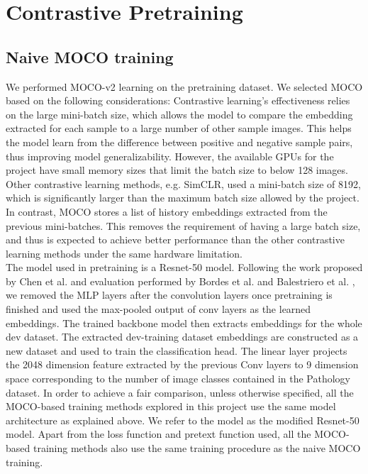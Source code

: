 \documentclass[12pt,twoside]{report}
\begin{document}
\section{Contrastive Pretraining}
\subsection{Naive MOCO training} \label{sec:naiveMOCO}
We performed MOCO-v2 \cite{mocov2} learning on the pretraining dataset. We selected MOCO based on the following considerations: Contrastive learning's effectiveness relies on the large mini-batch size, which allows the model to compare the embedding extracted for each sample to a large number of other sample images. This helps the model learn from the difference between positive and negative sample pairs, thus improving model generalizability. However, the available GPUs for the project have small memory sizes that limit the batch size to below 128 images. Other contrastive learning methods, e.g. SimCLR, used a mini-batch size of 8192, which is significantly larger than the maximum batch size allowed by the project. In contrast, MOCO stores a list of history embeddings extracted from the previous mini-batches. This removes the requirement of having a large batch size, and thus is expected to achieve better performance than the other contrastive learning methods under the same hardware limitation.\\

The model used in pretraining is a Resnet-50 model. Following the work proposed by Chen et al. \cite{mocov2} and evaluation performed by Bordes et al. \cite{guillotine} and Balestriero et al. \cite{cookbook}, we removed the MLP layers after the convolution layers once pretraining is finished and used the max-pooled output of conv layers as the learned embeddings. The trained backbone model then extracts embeddings for the whole dev dataset. The extracted dev-training dataset embeddings are constructed as a new dataset and used to train the classification head. The linear layer projects the 2048 dimension feature extracted by the previous Conv layers to 9 dimension space corresponding to the number of image classes contained in the Pathology dataset. In order to achieve a fair comparison, unless otherwise specified, all the MOCO-based training methods explored in this project use the same model architecture as explained above. We refer to the model as the modified Resnet-50 model. Apart from the loss function and pretext function used, all the MOCO-based training methods also use the same training procedure as the naive MOCO training.\\
\end{document}
